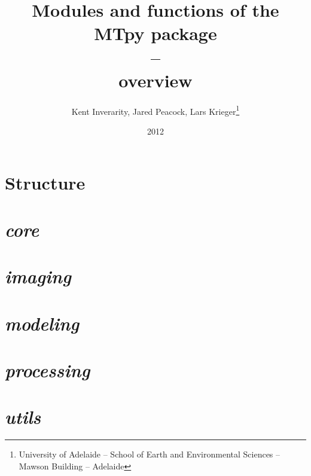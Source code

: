 \documentclass[%
onecolumn,%
11pt,%
DIV12%
]{scrreprt}
\title  {Modules and functions of the MTpy package \\ -- \\ overview}
\author{Kent Inverarity, Jared Peacock, Lars Krieger\thanks{University of Adelaide -- School of Earth and Environmental Sciences -- Mawson Building -- Adelaide}
  }
\date{2012}
\begin{document}
\linenumbers

\maketitle

\tableofcontents

\chapter{Structure}
\label{ch:Structure}



\chapter{ \textit{core} }
\label{ch:core}


\chapter{ \textit{imaging} }
\label{ch:imaging}


\chapter{ \textit{modeling} }
\label{ch:modeling}


\chapter{ \textit{processing} }
\label{ch:processing}


\chapter{ \textit{utils} }
\label{ch:utils}

\end{document}
